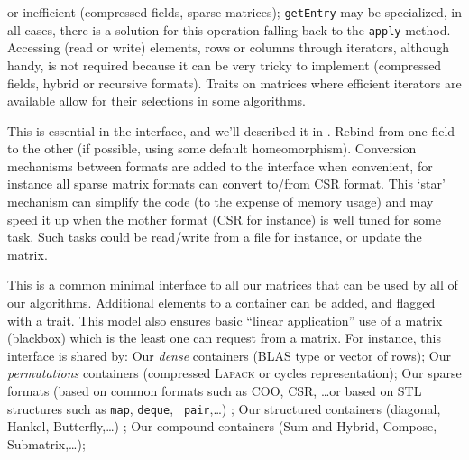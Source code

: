 		or inefficient (compressed fields, sparse matrices);
		\texttt{getEntry} may be specialized, in all cases, there is a
		solution for this operation falling back to the {\tt apply}
		method.
		Accessing (read or write) elements, rows or columns through
		iterators, although handy, is not required because it can be
		very tricky to implement (compressed fields, hybrid or
		recursive formats). Traits on matrices where efficient iterators
		are available allow for their selections in some algorithms.
		\begin{comment}
		(\danger We cannot have {\tt const} iterators for all formats
		(see hybrid), walking through a matrix in unspecified order can
		be problematic, for instance, in an hom when a zero may
		alter/change the representation. I don't understand hom more
		than I understand init/rebind by the way, and I won't
		understand it until the morphism is given/chooseable/enforced.
		Rebind is really hom, so why is it in the interface anyway?
		This is the same with getEntry. We don't require it because we
		have a solution. Also, if apply is to be implemented via a
		domain or {\tt mul}, we could stress it is in the interface for
		convenience when writing code only. End of \danger)
		\end{comment}
%
		This is essential in the \applin interface, and we'll described
		it in .
%
		Rebind from one field to the other (if
		possible, using some default homeomorphism).
%
	 Conversion mechanisms between formats are added to the interface when
	 convenient, for instance all sparse matrix formats can convert to/from
	 CSR format.  This `star' mechanism can simplify the code (to the
	 expense of memory usage) and may speed it up when the mother format
	 (CSR for instance) is well tuned for some task. Such tasks could be
	 read/write from a file for instance, or update the matrix.
%
	 \par
%
This is a common minimal interface to all our matrices that can be used by all
of our algorithms. Additional elements to a container can be added, and flagged
with a trait. This model also ensures basic ``linear application'' use of a
matrix (blackbox) which is the least one can request from a matrix.  For
instance, this interface is shared by: Our \emph{dense} containers (BLAS type or
vector of rows); Our  \emph{permutations} containers (compressed \textsc{Lapack} or
cycles representation); Our sparse formats (based on common formats such as
COO, CSR, \ldots or based on STL structures such as {\tt map}, {\tt deque}, {\tt
pair},\ldots) ; Our structured containers (diagonal, Hankel, Butterfly,\ldots) ;
Our compound containers (Sum and Hybrid, Compose, Submatrix,\ldots);
%
